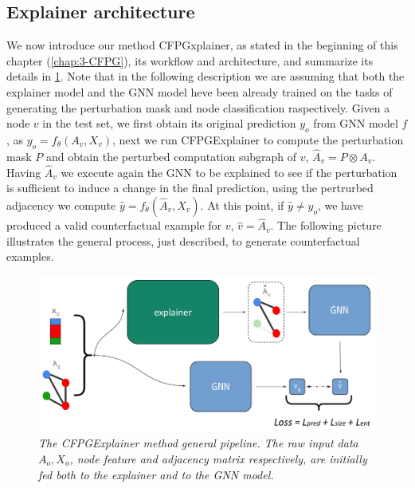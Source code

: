 \documentclass[binding=0.6cm]{sapthesis}
\begin{document}
\subsection{Explainer architecture}
\label{sec:cfpg.my.model}
We now introduce our method CFPGxplainer, as stated in the beginning of this chapter (\cref{chap:3-CFPG}), its workflow and architecture, and summarize its details in \cref{fig:cfpg.my.cfpg-model}. Note that in the following description we are assuming that both the explainer model and the GNN model heve been already trained on the tasks of generating the perturbation mask and node classification raspectively. 
Given a node $v$ in the test set, we first obtain its original prediction $y_o$ from GNN model $f$, as $y_o = f_{\theta}(A_v,X_v)$, next we run CFPGExplainer to compute the perturbation mask $P$ and obtain the perturbed computation subgraph of $v$, $\hat{A}_v = P \otimes A_v$. 
Having $\hat{A}_v$ we execute again the GNN to be explained to see if the perturbation is sufficient to induce a change in the final prediction, using the pertrurbed adjacency we compute $\hat{y} = f_{\theta}(\hat{A}_v,X_v)$. At this point, if $\hat{y} \ne y_o$, we have produced a valid counterfactual example for $v$, $\hat{v} = \hat{A}_v$. The following picture illustrates the general process, just described, to generate counterfactual examples. 
\bigskip
\begin{figure}[h]
    \centering
    \includegraphics[width=\textwidth]{imgs/cfpg/cfpg-over-pdf.png}
    \caption{\textit{The CFPGExplainer method general pipeline. The raw input data $A_o,X_o$, node feature and adjacency matrix respectively, are initially fed both to the explainer and to the GNN model.}}
    \label{fig:cfpg.my.cfpg-model}
\end{figure}
\end{document}

